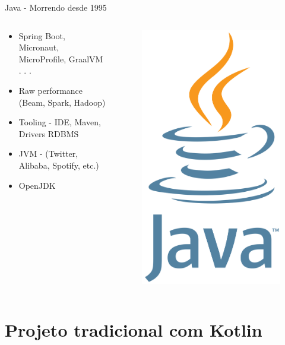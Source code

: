 \documentclass[aspectratio=169]{beamer}
\begin{document}
\begin{frame}{Java - Morrendo desde 1995}
\begin{columns}
\begin{column}{0.5\textwidth}
\begin{itemize}
	\item Spring Boot, Micronaut, MicroProfile, GraalVM . . .
	\item Raw performance (Beam, Spark, Hadoop)
	\item Tooling - IDE, Maven, Drivers RDBMS
	\item JVM - (Twitter, Alibaba, Spotify, etc.)
	\item OpenJDK
\end{itemize}
\end{column}
\begin{column}{0.5\textwidth}  %
\begin{figure}
	\centering
	\includegraphics[width=0.4\linewidth]{Images/java}
\end{figure}
\end{column}
\end{columns}
\end{frame}

{
    \section{Projeto tradicional com Kotlin}
}
\end{document}
